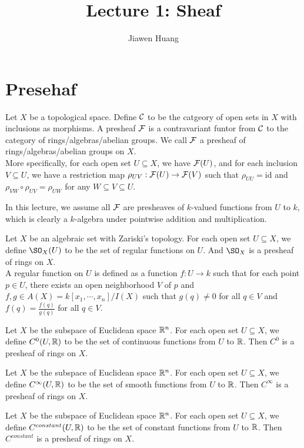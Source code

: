 \documentclass[12pt]{scrartcl}
\begin{document}
\title{Lecture 1: Sheaf}
\author{Jiawen Huang}
\date{}
\maketitle
\section{Presehaf}
\begin{definition}
    Let $X$ be a topological space. Define $\mathcal C$ to be the catgeory of open sets in $X$ with inclusions as morphisms. A presheaf $\mathcal F$ is a contravariant funtor from $\mathcal C$ to the category of rings/algebras/abelian groups. We call $\mathcal F$ a presheaf of rings/algebras/abelian groups on $X$. 
    \\
    
    More specifically, for each open set $U\subseteq X$, we have $\mathcal F(U)$, and for each inclusion $V\subseteq U$, we have a restriction map $\rho_{UV}:\mathcal F(U)\to \mathcal F(V)$ such that $\rho_{UU}=\mathrm{id}$ and $\rho_{VW}\circ \rho_{UV}=\rho_{UW}$ for any $W\subseteq V\subseteq U$. 
    \begin{center}
        In this lecture, we assume all $\mathcal F$ are presheaves of $k$-valued functions from $U$ to $k$, which is clearly a $k$-algebra under pointwise addition and multiplication.
    \end{center}
\end{definition}
\begin{example}
    Let $X$ be an algebraic set with Zariski's topology. For each open set $U\subseteq X$, we define $\SO_X(U)$ to be the set of regular functions on $U$. And $\SO_X$ is a presheaf of rings on $X$.
    \\

    A regular function on $U$ is defined as a function $f:U\to k$ such that for each point $p\in U$, there exists an open neighborhood $V$ of $p$ and $f, g\in A(X)=k[x_1,\cdots,x_n]/I(X)$ such that $g(q)\neq 0$ for all $q\in V$ and $f(q)=\frac{f(q)}{g(q)}$ for all $q\in V$.
\end{example}
\begin{example}
    Let $X$ be the subspace of Euclidean space $\mathbb R^n$. For each open set $U\subseteq X$, we define $C^0(U,\mathbb R)$ to be the set of continuous functions from $U$ to $\mathbb R$. Then $C^0$ is a presheaf of rings on $X$.
\end{example}
\begin{example}
    Let $X$ be the subspace of Euclidean space $\mathbb R^n$. For each open set $U\subseteq X$, we define $C^\infty(U,\mathbb R)$ to be the set of smooth functions from $U$ to $\mathbb R$. Then $C^\infty$ is a presheaf of rings on $X$.
\end{example}
\begin{example}
    Let $X$ be the subspace of Euclidean space $\mathbb R^n$. For each open set $U\subseteq X$, we define $C^{constant}(U,\mathbb R)$ to be the set of constant functions from $U$ to $\mathbb R$. Then $C^{constant}$ is a presheaf of rings on $X$.
\end{example}
\end{document}
